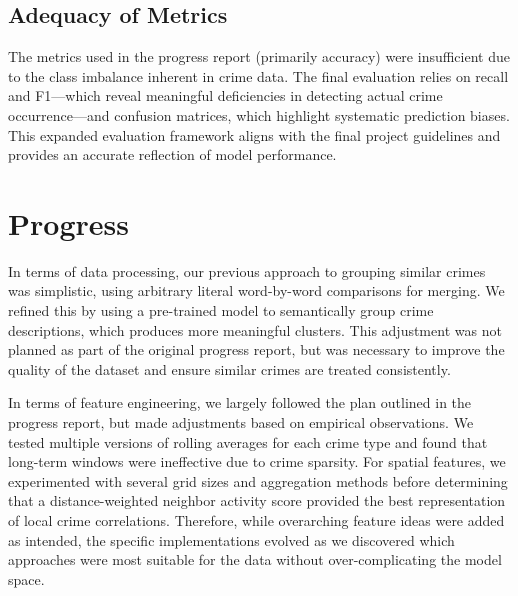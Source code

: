 \documentclass[11pt]{article}
\begin{document}
\subsection{Adequacy of Metrics}

The metrics used in the progress report (primarily accuracy) were insufficient due to the class imbalance inherent in crime data. The final evaluation relies on recall and F1—which reveal meaningful deficiencies in detecting actual crime occurrence—and confusion matrices, which highlight systematic prediction biases. This expanded evaluation framework aligns with the final project guidelines and provides an accurate reflection of model performance.


\section{Progress}

In terms of data processing, our previous approach to grouping similar crimes was simplistic, using arbitrary literal word-by-word comparisons for merging. We refined this by using a pre-trained model to semantically group crime descriptions, which produces more meaningful clusters. This adjustment was not planned as part of the original progress report, but was necessary to improve the quality of the dataset and ensure similar crimes are treated consistently.

In terms of feature engineering, we largely followed the plan outlined in the progress report, but made adjustments based on empirical observations. We tested multiple versions of rolling averages for each crime type and found that long-term windows were ineffective due to crime sparsity. For spatial features, we experimented with several grid sizes and aggregation methods before determining that a distance-weighted neighbor activity score provided the best representation of local crime correlations. Therefore, while overarching feature ideas were added as intended, the specific implementations evolved as we discovered which approaches were most suitable for the data without over-complicating the model space.
\end{document}
